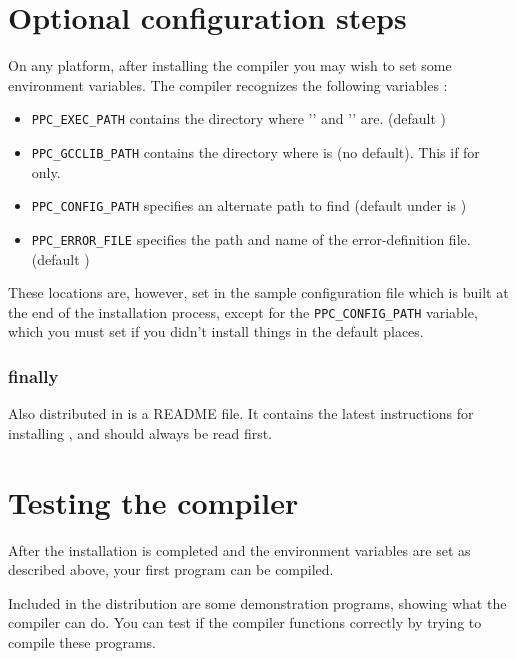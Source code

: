 \documentclass{report}
\begin{document}
\section{Optional configuration steps}
On any platform, after installing the compiler you may wish to set
some environment variables. The \fpc compiler
recognizes the following variables :
\begin{itemize}
\item \verb|PPC_EXEC_PATH| contains the directory where '' and
'' are. (default )
\item \verb|PPC_GCCLIB_PATH| contains the directory where 
is (no default). This if for \linux only.
\item \verb|PPC_CONFIG_PATH| specifies an alternate path to find
 (default under \linux is )
\item \verb|PPC_ERROR_FILE|  specifies the path and name of the error-definition file.
                  (default )
\end{itemize}

These locations are, however, set in the sample configuration file which is
built at the end of the installation process, except for the
\verb|PPC_CONFIG_PATH| variable, which you must set if you didn't install
things in the default places.
\subsubsection{finally}
Also distributed in \fpc is a README file. It contains the latest
instructions for installing \fpc, and should always be read first.


\section{Testing the compiler}
After the installation is completed and the environment variables are
set as described above, your first program can be compiled.

Included in the \fpc distribution are some demonstration programs,
showing what the compiler can do.
You can test if the compiler functions correctly by trying to compile
these programs.
\end{document}
